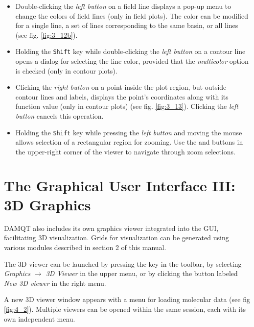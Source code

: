 \documentclass[10pt]{article}
\begin{document}
\begin{itemize}
\vspace{1cm}

\item Double-clicking the {\it left button} on a field line displays a pop-up menu  
to change the colors of field lines (only in field plots).  
The color can be modified for a single line, a set of lines corresponding to the same basin,  
or all lines (see fig. \ref{fig:3_12b}).  

\item Holding the \texttt{Shift} key while double-clicking the {\it left button} on a contour line  
opens a dialog for selecting the line color, provided that the {\it multicolor}  
 option is checked (only in contour plots).  

\item Clicking the {\it right button} on a point inside the plot region,  
but outside contour lines and labels,  
displays the point's coordinates along with its function value (only in contour plots)  
(see fig. \ref{fig:3_13}). Clicking the {\it left button} cancels this operation.  

\item Holding the \texttt{Shift} key while pressing the {\it left button} and moving the mouse  
allows selection of a rectangular region for zooming.  
Use the \zoomin{} and \zoomout{}  
buttons in the upper-right corner of the viewer to navigate through zoom selections.  

\end{itemize}



\newpage

\section{The Graphical User Interface III: 3D Graphics \label{sec:4}}

DAMQT also includes its own graphics viewer integrated into the  
GUI, facilitating 3D visualization. Grids for visualization can be generated  
using various modules described in section 2 of this manual.  

The 3D viewer can be launched by pressing the key \bigtoolbV in the toolbar, by selecting  
{\it Graphics $\rightarrow$ 3D Viewer} in the upper menu, or by clicking the button labeled  
{\it New 3D viewer} in the right menu.  

A new 3D viewer window appears with a menu for loading molecular data (see fig \ref{fig:4_2}).  
Multiple viewers can be opened within the same session, each with its own independent menu.  
\end{document}
